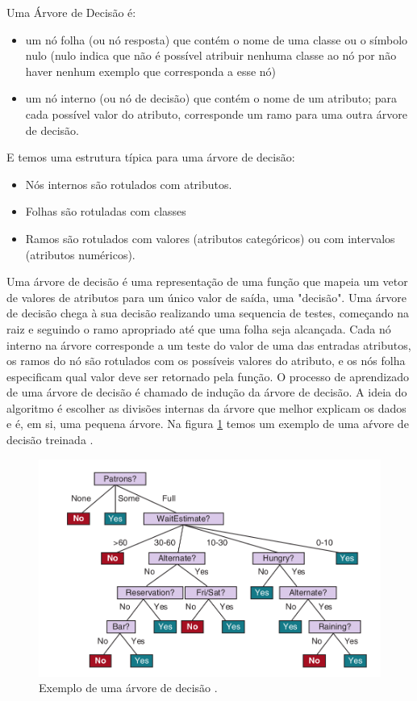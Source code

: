 Uma Árvore de Decisão é:
\begin{itemize}
    \item um nó folha (ou nó resposta) que contém o nome de uma classe ou o símbolo nulo (nulo indica que não é possível atribuir nenhuma classe ao nó por não haver nenhum exemplo que corresponda a esse nó)
\item um nó interno (ou nó de decisão) que contém o nome de um atributo; para cada possível valor do atributo, corresponde um ramo para uma outra árvore de decisão.
\end{itemize}
E temos uma estrutura típica para uma árvore de decisão:
\begin{itemize}
    \item Nós internos são rotulados com atributos.
    \item Folhas são rotuladas com classes
    \item Ramos são rotulados com valores (atributos categóricos) ou com intervalos (atributos numéricos).
\end{itemize}
Uma árvore de decisão é uma representação de uma função que mapeia um vetor de valores de atributos para um único valor de saída, uma "decisão". Uma árvore de decisão chega à sua decisão realizando uma sequencia de testes, começando na raiz e seguindo o ramo apropriado até que uma folha seja alcançada. Cada nó interno na árvore corresponde a um teste do valor de uma das entradas atributos, os ramos do nó são rotulados com os possíveis valores do atributo, e os nós folha especificam qual valor deve ser retornado pela função. O processo de aprendizado de uma árvore de decisão é chamado de indução da árvore de decisão. A ideia do algoritmo é escolher as divisões internas da árvore que melhor explicam os dados e é, em si, uma pequena árvore. Na figura \ref{fig:ex:arvore} temos um exemplo de uma aŕvore de decisão treinada \cite{russel}.

\begin{figure}[H]
 \caption{Exemplo de uma árvore de decisão \cite{russel}.}
 \label{fig:ex:arvore}
 \centering
 \includegraphics[scale=0.4]{images/exemplo_arvore.png}
\end{figure}

